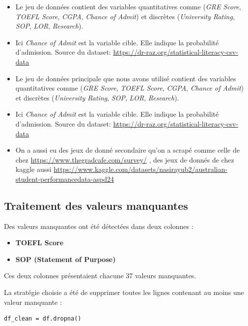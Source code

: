 \begin{itemize}
    \item Le jeu de données contient des variables quantitatives comme  (\textit{GRE Score}, \textit{TOEFL Score}, \textit{CGPA}, \textit{Chance of Admit}) et discrètes (\textit{University Rating}, \textit{SOP}, \textit{LOR}, \textit{Research}).
    \item Ici \textit{Chance of Admit} est la variable cible. Elle indique la probabilité d’admission.
    Source du dataset: \url{https://dr-raz.org/statistical-literacy-csv-data}
\end{itemize}
\begin{itemize}
    \item Le jeu de données principale que nous avons utilisé contient des variables quantitatives comme  (\textit{GRE Score}, \textit{TOEFL Score}, \textit{CGPA}, \textit{Chance of Admit}) et discrètes (\textit{University Rating}, \textit{SOP}, \textit{LOR}, \textit{Research}).
    \item Ici \textit{Chance of Admit} est la variable cible. Elle indique la probabilité d’admission.
    Source du dataset: \url{https://dr-raz.org/statistical-literacy-csv-data}
    \item On a aussi eu des jeux de donné secondaire qu'on a scrapé comme celle de chez \url{https://www.thegradcafe.com/survey/} , des jeux de donnés de chez kaggle aussi \url{https://www.kaggle.com/datasets/nasirayub2/australian-student-performancedata-aspd24}
\end{itemize}

\subsection{Traitement des valeurs manquantes}

Des valeurs manquantes ont été détectées dans deux colonnes :
\begin{itemize}
    \item \textbf{TOEFL Score}
    \item \textbf{SOP (Statement of Purpose)}
\end{itemize}

Ces deux colonnes présentaient chacune 37 valeurs manquantes.

La stratégie choisie a été de supprimer toutes les lignes contenant au moins une valeur manquante :

\begin{verbatim}
df_clean = df.dropna()
\end{verbatim}

